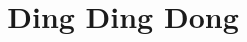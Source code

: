 \documentclass{article}
\begin{document}
\author{}
\title{Ding Ding Dong}
\date{}
\maketitle


\end{document}
